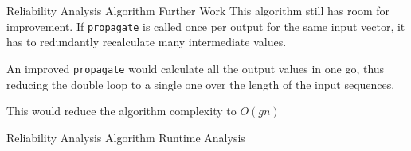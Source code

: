 \documentclass[12pt]{beamer}
\begin{document}
\begin{frame}[fragile]{Reliability Analysis Algorithm \small Further Work}
This algorithm still has room for improvement. If \verb|propagate| is called once per output for the same input vector, it has to redundantly recalculate many intermediate values.
\vspace{0.25cm}

An improved \verb|propagate| would calculate all the output values in one go, thus reducing the double loop to a single one over the length of the input sequences.
\vspace{0.25cm}

This would reduce the algorithm complexity to $O(gn)$
\end{frame}

\begin{frame}{Reliability Analysis Algorithm \small Runtime Analysis}
\center
{}
\end{frame}
\end{document}
